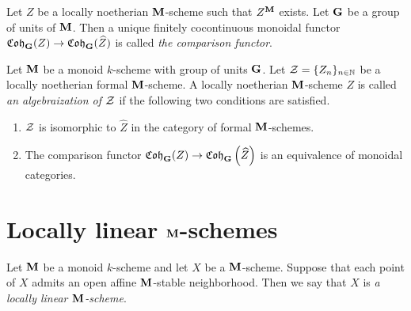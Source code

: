 \begin{definition}
Let $Z$ be a locally noetherian $\mathbf{M}$-scheme such that $Z^{\mathbf{M}}$ exists. Let $\mathbf{G}$ be a group of units of $\mathbf{M}$. Then a unique finitely cocontinuous monoidal functor $\mathfrak{Coh}_{\mathbf{G}}(Z)\rightarrow \mathfrak{Coh}_{\mathbf{G}}(\widehat{Z})$ is called \textit{the comparison functor}.
\end{definition}

\begin{definition}
Let $\mathbf{M}$ be a monoid $k$-scheme with group of units $\mathbf{G}$. Let ${\mathcal Z} = \{Z_n\}_{n\in \mathbb{N}}$ be a locally noetherian formal $\mathbf{M}$-scheme. A locally noetherian $\mathbf{M}$-scheme $Z$ is called \textit{an algebraization of ${\mathcal Z}$} if the following two conditions are satisfied.
\begin{enumerate}[label=\textbf{(\arabic*)}, leftmargin=3.0em]
\item ${\mathcal Z}$ is isomorphic to $\widehat{Z}$ in the category of formal $\mathbf{M}$-schemes.
\item The comparison functor $\mathfrak{Coh}_{\mathbf{G}}(Z)\rightarrow \mathfrak{Coh}_{\mathbf{G}}\left(\widehat{Z}\right)$ is an equivalence of monoidal categories.
\end{enumerate}
\end{definition}

\section{Locally linear $\mathbf{M}$-schemes}

\begin{definition}
Let $\mathbf{M}$ be a monoid $k$-scheme and let $X$ be a $\mathbf{M}$-scheme. Suppose that each point of $X$ admits an open affine $\mathbf{M}$-stable neighborhood. Then we say that $X$ is \textit{a locally linear $\mathbf{M}$-scheme}.
\end{definition}

